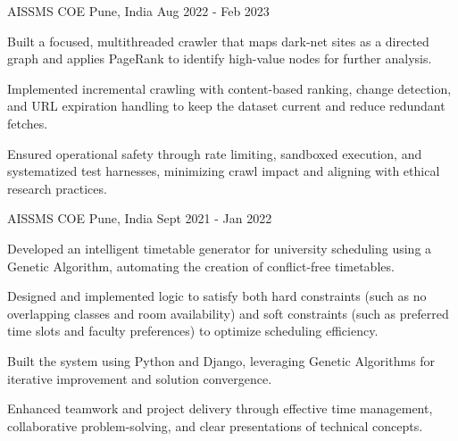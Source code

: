 \filbreak
{}


\begin{cventries}

    \cventry
    {AISSMS COE} %
    {} %
    {Pune, India} %
    {Aug 2022 - Feb 2023} %
    {
        \begin{cvitems} %
            \item {}
            \item {Built a focused, multithreaded crawler that maps dark-net sites as a directed graph and applies PageRank to identify high-value nodes for further analysis.}
            \item {Implemented incremental crawling with content-based ranking, change detection, and URL expiration handling to keep the dataset current and reduce redundant fetches.}
            \item {Ensured operational safety through rate limiting, sandboxed execution, and systematized test harnesses, minimizing crawl impact and aligning with ethical research practices.}
        \end{cvitems}
    }

    \cventry
    {AISSMS COE} %
    {} %
    {Pune, India} %
    {Sept 2021 - Jan 2022} %
    {
        \begin{cvitems} %
            \item {Developed an intelligent timetable generator for university scheduling using a Genetic Algorithm, automating the creation of conflict-free timetables.}
            \item {Designed and implemented logic to satisfy both hard constraints (such as no overlapping classes and room availability) and soft constraints (such as preferred time slots and faculty preferences) to optimize scheduling efficiency.}
            \item {Built the system using Python and Django, leveraging Genetic Algorithms for iterative improvement and solution convergence.}
            \item {Enhanced teamwork and project delivery through effective time management, collaborative problem-solving, and clear presentations of technical concepts.}
        \end{cvitems}
    }


\end{cventries}
